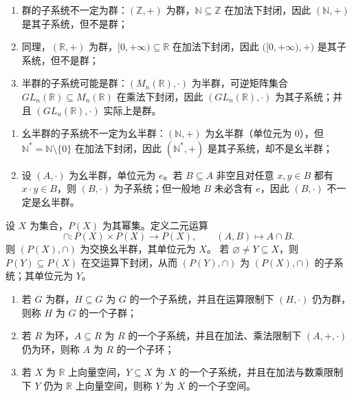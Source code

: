 \documentclass[lang=cn,a4paper,newtx]{elegantbook}
\begin{document}
\begin{example}
\leavevmode
\begin{enumerate}
  \item 群的子系统不一定为群：$(\mathbb Z,+)$ 为群，$\mathbb N\subseteq\mathbb Z$ 在加法下封闭，因此 $(\mathbb N,+)$ 是其子系统，但不是群；
  \item 同理，$(\mathbb R,+)$ 为群，$[0,+\infty)\subseteq\mathbb R$ 在加法下封闭，因此 $\bigl([0,+\infty),+\bigr)$ 是其子系统，但不是群；
  \item 半群的子系统可能是群：$(M_n(\mathbb R),\cdot)$ 为半群，可逆矩阵集合 $GL_n(\mathbb R)\subseteq M_n(\mathbb R)$ 在乘法下封闭，因此 $(GL_n(\mathbb R),\cdot)$ 为其子系统；并且 $(GL_n(\mathbb R),\cdot)$ 实际上是群。
\end{enumerate}
\end{example}

\begin{example}
\leavevmode
\begin{enumerate}
  \item 幺半群的子系统不一定为幺半群：$(\mathbb N,+)$ 为幺半群（单位元为 $0$），但 $\mathbb N^{*}=\mathbb N\setminus\{0\}$ 在加法下封闭，因此 $(\mathbb N^{*},+)$ 是其子系统，却不是幺半群；
  \item 设 $(A,\cdot)$ 为幺半群，单位元为 $e$。若 $B\subseteq A$ 非空且对任意 $x,y\in B$ 都有 $x\cdot y\in B$，则 $(B,\cdot)$ 为子系统；但一般地 $B$ 未必含有 $e$，因此 $(B,\cdot)$ 不一定是幺半群。
\end{enumerate}
\end{example}

\begin{example}
设 $X$ 为集合，$P(X)$ 为其幂集。定义二元运算
\[
  \cap:P(X)\times P(X)\to P(X),\qquad (A,B)\mapsto A\cap B.
\]
则 $(P(X),\cap)$ 为交换幺半群，其单位元为 $X$。
若 $\varnothing\neq Y\subseteq X$，则 $P(Y)\subseteq P(X)$ 在交运算下封闭，从而 $(P(Y),\cap)$ 为 $(P(X),\cap)$ 的子系统；其单位元为 $Y$。
\end{example}

\begin{definition}[子群、子环、子空间]
\leavevmode
\begin{enumerate}
  \item 若 $G$ 为群，$H\subseteq G$ 为 $G$ 的一个子系统，并且在运算限制下 $(H,\cdot)$ 仍为群，则称 $H$ 为 $G$ 的一个子群；
  \item 若 $R$ 为环，$A\subseteq R$ 为 $R$ 的一个子系统，并且在加法、乘法限制下 $(A,+,\cdot)$ 仍为环，则称 $A$ 为 $R$ 的一个子环；
  \item 若 $X$ 为 $\mathbb R$ 上向量空间，$Y\subseteq X$ 为 $X$ 的一个子系统，并且在加法与数乘限制下 $Y$ 仍为 $\mathbb R$ 上向量空间，则称 $Y$ 为 $X$ 的一个子空间。
\end{enumerate}
\end{definition}
\end{document}
